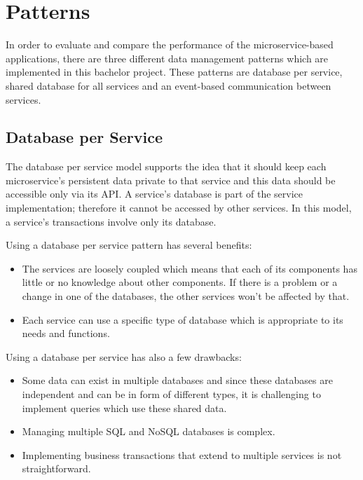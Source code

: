 \documentclass{article}
\begin{document}
\pagebreak


\section{Patterns} \label{Patterns}

In order to evaluate and compare the performance of the microservice-based applications, there are three different data management patterns which are implemented in this bachelor project. These patterns are database per service, shared database for all services and an event-based communication between services. 

\subsection{Database per Service}

The database per service model supports the idea that it should keep each microservice’s persistent data private to that service and this data should be accessible only via its API. A service’s database is part of the service implementation; therefore it cannot be accessed by other services. In this model, a service’s transactions involve only its database\cite{microserviceDB}. 
\bigbreak

\noindent Using a database per service pattern has several benefits:

\begin{itemize}
    \item The services are loosely coupled which means that each of its components has little or no knowledge about other components. If there is a problem or a change in one of the databases, the other services won’t be affected by that.
    \item Each service can use a specific type of database which is appropriate to its needs and functions. 
\end{itemize}

\noindent Using a database per service has also a few drawbacks\cite{microserviceDB}:

\begin{itemize}
    \item 	Some data can exist in multiple databases and since these databases are independent and can be in form of different types, it is challenging to implement queries which use these shared data. 
    \item	Managing multiple SQL and NoSQL databases is complex.
    \item	Implementing business transactions that extend to multiple services is not straightforward.
\end{itemize}
\end{document}
